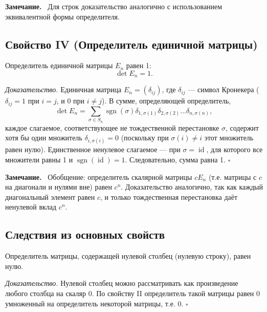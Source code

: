 \documentclass[a4paper,12pt]{article}
\newcommand{\myremark}{\textbf{Замечание.}\ }
\theoremstyle{definition}
\theoremstyle{plain}
\theoremstyle{remark}
\begin{document}
	\myremark
	Для строк доказательство аналогично с использованием эквивалентной формы определителя.
	
	\subsection{Свойство IV (Определитель единичной матрицы)}
	
	\begin{tcolorbox}[colback=green!5, colframe=green!50!black, title=Свойство IV]
		Определитель единичной матрицы \( E_n \) равен 1:
		\[
		\det E_n = 1.
		\]
	\end{tcolorbox}
	
	\medskip
	\textit{Доказательство.}
	Единичная матрица \( E_n = (\delta_{ij}) \), где \( \delta_{ij} \) — символ Кронекера (\( \delta_{ij} = 1 \) при \( i = j \), и \( 0 \) при \( i \neq j \)). В сумме, определяющей определитель,
	\[
	\det E_n = \sum_{\sigma \in S_n} \operatorname{sgn}(\sigma) \delta_{1,\sigma(1)} \delta_{2,\sigma(2)} \dots \delta_{n,\sigma(n)},
	\]
	каждое слагаемое, соответствующее не тождественной перестановке \( \sigma \), содержит хотя бы один множитель \( \delta_{i,\sigma(i)} = 0 \) (поскольку при \( \sigma(i) \neq i \) этот множитель равен нулю). Единственное ненулевое слагаемое — при \( \sigma = \operatorname{id} \), для которого все множители равны 1 и \( \operatorname{sgn}(\operatorname{id}) = 1 \). Следовательно, сумма равна 1. \hfill \(\square\)
	
	\myremark
	Обобщение: определитель скалярной матрицы \( cE_n \) (т.е. матрицы с \( c \) на диагонали и нулями вне) равен \( c^n \). Доказательство аналогично, так как каждый диагональный элемент равен \( c \), и только тождественная перестановка даёт ненулевой вклад \( c^n \).
	
	\subsection{Следствия из основных свойств}
	
	\begin{tcolorbox}[colback=yellow!5, colframe=orange!50!black, title=Следствие 1]
		Определитель матрицы, содержащей нулевой столбец (нулевую строку), равен нулю.
	\end{tcolorbox}
	\textit{Доказательство.} Нулевой столбец можно рассматривать как произведение любого столбца на скаляр \( 0 \). По свойству II определитель такой матрицы равен \( 0 \) умноженный на определитель некоторой матрицы, т.е. \( 0 \). \hfill \(\square\)
	
\end{document}
